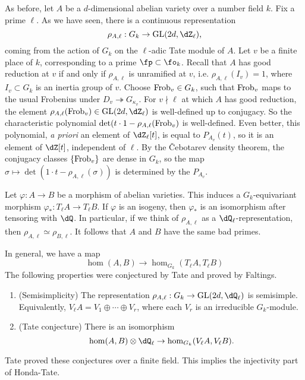As before, let $A$ be a $d$-dimensional abelian variety over a number field 
$k$. Fix a prime $\ell$. As we have seen, there is a continuous representation 
\[
  \rho_{A,\ell} : G_k \to \operatorname{GL}(2 d,\dZ_\ell) \text{,}
\]
coming from the action of $G_k$ on the $\ell$-adic Tate module of $A$. Let $v$ 
be a finite place of $k$, corresponding to a prime $\fp\subset \fo_k$. Recall 
that $A$ has good reduction at $v$ if and only if $\rho_{A,\ell}$ is unramified 
at $v$, i.e. $\rho_{A,\ell}(I_v)=1$, where $I_v\subset G_k$ is an inertia 
group of $v$. Choose $\mathrm{Frob}_v\in G_k$, such that $\mathrm{Frob}_v$ maps to the usual 
Frobenius under $D_v \twoheadrightarrow G_{\kappa_v}$. For $v\nmid \ell$ at 
which $A$ has good reduction, the element 
$\rho_{A,\ell}(\frob_v)\in \operatorname{GL}(2 d,\dZ_\ell)$ is well-defined up 
to conjugacy. So the characteristic polynomial 
$\det(t\cdot 1-\rho_{A,\ell}(\mathrm{Frob}_v)$ is well-defined. Even better, this 
polynomial, \emph{a priori} an element of $\dZ_\ell[t]$, is equal to 
$P_{A_v}(t)$, so it is an element of $\dZ[t]$, independent of $\ell$. By the 
\v Cebotarev density theorem, the conjugacy classes $\{\mathrm{Frob}_v\}$ are dense 
in $G_k$, so the map 
$\sigma\mapsto \det(1\cdot t-\rho_{A,\ell}(\sigma))$ is determined by the 
$P_{A_v}$. 

Let $\varphi:A\to B$ be a morphism of abelian varieties. This induces a 
$G_k$-equivariant morphism $\varphi_\ast:T_\ell A \to T_\ell B$. If $\varphi$ 
is an isogeny, then $\varphi_\ast$ is an isomorphism after tensoring with 
$\dQ$. In particular, if we think of $\rho_{A,\ell}$ as a 
$\dQ_\ell$-representation, then $\rho_{A,\ell}\simeq \rho_{B,\ell}$. It follows 
that $A$ and $B$ have the same bad primes. 

In general, we have a map 
\[
  \hom(A,B) \to \hom_{G_k}(T_\ell A,T_\ell B)
\]
The following properties were conjectured by Tate and proved by Faltings. 
\begin{enumerate}
  \item (Semisimplicity) The representation 
    $\rho_{A,\ell}:G_k \to \operatorname{GL}(2 d,\dQ_\ell)$ is semisimple. 
    Equivalently, $V_\ell A = V_1 \oplus \cdots \oplus V_r$, where each 
    $V_r$ is an irreducible $G_k$-module. 
  \item (Tate conjecture) There is an isomorphism 
    \[
      \hom(A,B)\otimes\dQ_\ell \to \hom_{G_k}(V_\ell A,V_\ell B) \text{.}
    \]
\end{enumerate}

Tate proved these conjectures over a finite field. This implies the injectivity 
part of Honda-Tate. 

